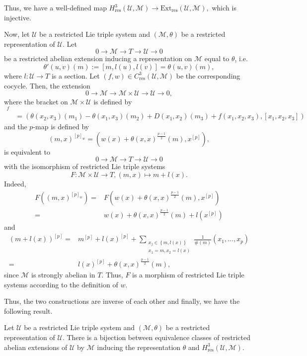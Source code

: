 \documentclass[11pt, twoside]{article}
\begin{document}
Thus, we have a well-defined map $H^3_\mathrm{res}(\mathcal{U},\mathcal{M})\to \mathrm{Ext}_\mathrm{res}(\mathcal{U},\mathcal{M}) ,$ which is injective. 

Now, let $\mathcal{U}$ be a restricted Lie triple system and $(\mathcal{M},\theta)$ be a restricted representation of $\mathcal{U}$. Let $$0\to \mathcal{M} \to T\to \mathcal{U}\to 0 $$ be a restricted abelian extension inducing a representation on $\mathcal{M}$ equal to $\theta$, i.e. $$\theta'(u,v)(m):=[m,l(u),l(v)]=\theta(u,v)(m), $$ where $l:\mathcal{U}\to T$ is a section. Let $(f,w)\in C^3_\mathrm{res}(\mathcal{U},\mathcal{M}) $ be the corresponding cocycle. Then, the extension $$0\to \mathcal{M}\to \mathcal{M}\times \mathcal{U}\to \mathcal{U}\to 0 ,$$ where the bracket on $\mathcal{M}\times \mathcal{U} $ is defined by  \begin{align*}
    [(m_1,x_1)&,(m_2,x_2),(m_3,x_3)]_f \\ &= (\theta(x_2,x_3)(m_1)- \theta(x_1,x_3)(m_2)+D(x_1,x_2)(m_3)+f(x_1,x_2,x_3),[x_1,x_2,x_3])
\end{align*} and the $p$-map is defined by $$(m,x)^{[p]_w}=(w(x)+\theta(x,x)^\frac{p-1}{2}(m),x^{[p]}), $$ is equivalent to $$0\to \mathcal{M} \to T\to \mathcal{U}\to 0 $$ with the isomorphism of restricted Lie triple systems $$F:\mathcal{M}\times \mathcal{U}\to T, (m,x)\mapsto m+l(x). $$ Indeed, \begin{align*}
    F((m,x)^{[p]_w})=& F(w(x)+\theta(x,x)^\frac{p-1}{2}(m),x^{[p]})\\ =& w(x)+\theta(x,x)^\frac{p-1}{2}(m)+l(x^{[p]})
\end{align*} and \begin{align*}
    (m+l(x))^{[p]}=& m^{[p]}+l(x)^{[p]}+\sum_{\substack{x_j\in \left\{m,l(x) \right\}\\x_1=m,x_2=l(x)}}\frac{1}{\#(m)}(x_1,\ldots,x_p)\\ =& l(x)^{[p]}+ \theta(x,x)^\frac{p-1}{2}(m),
\end{align*} since $\mathcal{M}$ is strongly abelian in $T$. Thus, $F$ is a morphism of restricted Lie triple systems according to the definition of $w$.

Thus, the two constructions are inverse of each other and finally, we have the following result. 

\begin{thm}
    Let $\mathcal{U} $ be a restricted Lie triple system and $(\mathcal{M},\theta) $ be a restricted representation of $\mathcal{U}$. There is a bijection between equivalence classes of restricted abelian extensions of $\mathcal{U}$ by $\mathcal{M}$ inducing the representation $\theta$ and $H^3_\mathrm{res}(\mathcal{U},\mathcal{M}) $.
\end{thm}
\end{document}
